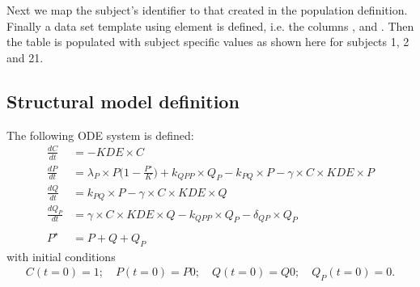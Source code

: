 Next we map the subject's identifier  to that created in the population definition. 
Finally a data set template using  element is defined, 
i.e. the columns ,  and .
Then the table is populated with subject specific values as shown here for subjects 1, 2 and 21.


\subsection{Structural model definition}
The following ODE system is defined:
\begin{align*}
\frac{dC}{dt} &= -\textit{KDE} \times C  \nonumber \\
\frac{dP}{dt} &= \lambda_P \times P \Big( 1 - \frac{P^\star}{K} \Big) + k_{\textit{QPP}} \times Q_P - k_{\textit{PQ}} \times P - \gamma \times C \times \textit{KDE} \times P  \nonumber \\
\frac{dQ}{dt} &= k_{PQ}\times P - \gamma \times C\times \mathit{KDE}\times Q \nonumber \\
\frac{dQ_P}{dt} &= \gamma \times C \times \textit{KDE} \times Q - k_{\textit{QPP}} \times Q_P - \delta_{\textit{QP}} \times Q_P  \nonumber \\ \nonumber \\
P^{\star} &= P + Q + Q_P \nonumber
\end{align*}
with initial conditions
\begin{align*}
C(t=0) = 1; \quad P(t=0) = P0; \quad Q(t=0) = Q0; \quad Q_P(t=0) = 0.  \nonumber
\end{align*}

